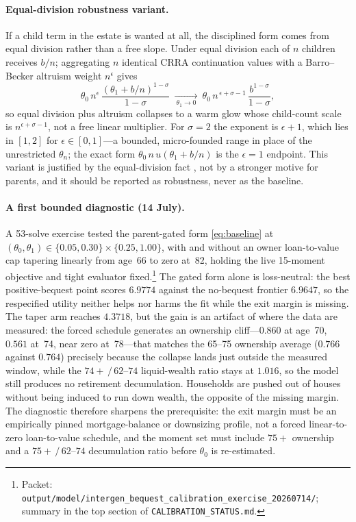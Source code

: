 \documentclass[10pt]{article}
\begin{document}
\paragraph{Equal-division robustness variant.} If a child term in the estate is
wanted at all, the disciplined form comes from equal division rather than a
free slope. Under equal division each of $n$ children receives $b/n$;
aggregating $n$ identical CRRA continuation values with a Barro--Becker
altruism weight $n^{\epsilon}$ \citep{barrobecker1989} gives
%
\begin{equation}
\theta_0\,n^{\epsilon}\,\frac{(\theta_1+b/n)^{1-\sigma}}{1-\sigma}
\ \xrightarrow[\ \theta_1\to0\ ]{}\
\theta_0\,n^{\,\epsilon+\sigma-1}\,\frac{b^{1-\sigma}}{1-\sigma},
\label{eq:equaldiv}
\end{equation}
%
so equal division plus altruism collapses to a warm glow whose child-count
scale is $n^{\epsilon+\sigma-1}$, not a free linear multiplier. For $\sigma=2$
the exponent is $\epsilon+1$, which lies in $[1,2]$ for $\epsilon\in[0,1]$---a
bounded, micro-founded range in place of the unrestricted $\theta_n$; the exact
form $\theta_0\,n\,u(\theta_1+b/n)$ is the $\epsilon=1$ endpoint. This variant
is justified by the equal-division fact \citep{mcgarry1999,wilhelm1996}, not by
a stronger motive for parents, and it should be reported as robustness, never
as the baseline.

\paragraph{A first bounded diagnostic (14 July).} A 53-solve exercise tested
the parent-gated form \eqref{eq:baseline} at
$(\theta_0,\theta_1)\in\{0.05,0.30\}\times\{0.25,1.00\}$, with and without an
owner loan-to-value cap tapering linearly from age~66 to zero at~82, holding
the live 15-moment objective and tight evaluator fixed.\footnote{Packet:
\texttt{output/model/intergen\_bequest\_calibration\_exercise\_20260714/};
summary in the top section of \texttt{CALIBRATION\_STATUS.md}.} The gated form
alone is loss-neutral: the best positive-bequest point scores $6.9774$ against
the no-bequest frontier $6.9647$, so the respecified utility neither helps nor
harms the fit while the exit margin is missing. The taper arm reaches
$4.3718$, but the gain is an artifact of where the data are measured: the
forced schedule generates an ownership cliff---$0.860$ at age~70, $0.561$
at~74, near zero at~78---that matches the 65--75 ownership average ($0.766$
against $0.764$) precisely because the collapse lands just outside the
measured window, while the $74+\,/\,62\text{--}74$ liquid-wealth ratio stays
at $1.016$, so the model still produces no retirement decumulation. Households
are pushed out of houses without being induced to run down wealth, the
opposite of the missing margin. The diagnostic therefore sharpens the
prerequisite: the exit margin must be an empirically pinned mortgage-balance
or downsizing profile, not a forced linear-to-zero loan-to-value schedule, and
the moment set must include $75+$ ownership and a $75+\,/\,62\text{--}74$
decumulation ratio before $\theta_0$ is re-estimated.
\end{document}
